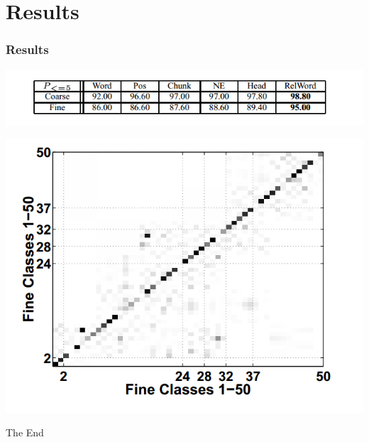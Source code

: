\documentclass{beamer}
\begin{document}
    \section{Results}

    \begin{frame}
    \frametitle{Results}
         \includegraphics{3.png}   
         
         \includegraphics[scale=0.75]{4.png}
    \end{frame}


    \begin{frame}
    \Huge{\centerline{The End}}
    \end{frame}
    
    
    
\end{document}
